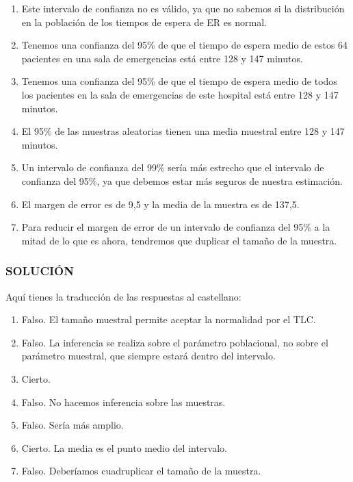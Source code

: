 \documentclass[
]{article}
\providecommand{\tightlist}{%
  \setlength{\itemsep}{0pt}\setlength{\parskip}{0pt}}
\begin{document}
\begin{enumerate}
\def\labelenumi{\alph{enumi})}
\tightlist
\item
  Este intervalo de confianza no es válido, ya que no sabemos si la distribución en la población de los tiempos de espera de ER es normal.\\
\item
  Tenemos una confianza del 95\% de que el tiempo de espera medio de estos 64 pacientes en una sala de emergencias está entre 128 y 147 minutos.\\
\item
  Tenemos una confianza del 95\% de que el tiempo de espera medio de todos los pacientes en la sala de emergencias de este hospital está entre 128 y 147 minutos.\\
\item
  El 95\% de las muestras aleatorias tienen una media muestral entre 128 y 147 minutos.\\
\item
  Un intervalo de confianza del 99\% sería más estrecho que el intervalo de confianza del 95\%, ya que debemos estar más seguros de nuestra estimación.\\
\item
  El margen de error es de 9,5 y la media de la muestra es de 137,5.\\
\item
  Para reducir el margen de error de un intervalo de confianza del 95\% a la mitad de lo que es ahora, tendremos que duplicar el tamaño de la muestra.
\end{enumerate}

\subsubsection{SOLUCIÓN}\label{soluciuxf3n-16}

Aquí tienes la traducción de las respuestas al castellano:

\begin{enumerate}
\def\labelenumi{\alph{enumi})}
\item
  Falso. El tamaño muestral permite aceptar la normalidad por el TLC.
\item
  Falso. La inferencia se realiza sobre el parámetro poblacional, no sobre el parámetro muestral, que siempre estará dentro del intervalo.
\item
  Cierto.
\item
  Falso. No hacemos inferencia sobre las muestras.
\item
  Falso. Sería más amplio.
\item
  Cierto. La media es el punto medio del intervalo.
\item
  Falso. Deberíamos cuadruplicar el tamaño de la muestra.
\end{enumerate}
\end{document}
